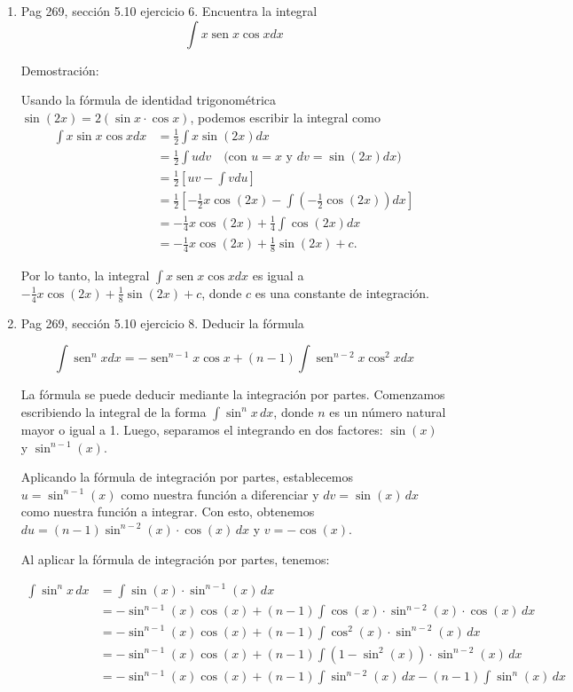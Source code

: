 \documentclass{report}
\begin{document}
\begin{enumerate}
        \item Pag 269, sección 5.10 ejercicio 6. Encuentra la integral $$\int x \operatorname{sen} x \cos x dx$$
        
        Demostración:
        
        Usando la fórmula de identidad trigonométrica $\sin(2x) = 2(\sin x \cdot \cos x)$, podemos escribir la integral como
        \begin{align*}
        \int x \sin x \cos x dx &= \frac{1}{2} \int x \sin(2x) dx \\
        &= \frac{1}{2} \int u dv \quad \text{(con $u = x$ y $dv = \sin(2x) dx$)} \\
        &= \frac{1}{2} \left[ uv - \int v du \right] \\
        &= \frac{1}{2} \left[ -\frac{1}{2} x \cos(2x) - \int \left(-\frac{1}{2} \cos(2x) \right) dx \right] \\
        &= -\frac{1}{4} x \cos(2x) + \frac{1}{4} \int \cos(2x) dx \\
        &= -\frac{1}{4} x \cos(2x) + \frac{1}{8} \sin(2x) + c.
        \end{align*}
        
        Por lo tanto, la integral $\int x \operatorname{sen} x \cos x dx$ es igual a $-\frac{1}{4} x \cos(2x) + \frac{1}{8} \sin(2x) + c$, donde $c$ es una constante de integración.
        
        \item Pag 269, sección 5.10 ejercicio 8. Deducir la fórmula 
        
        $$
        \int \operatorname{sen}^{n} x d x=-\operatorname{sen}^{n-1} x \cos x+(n-1) \int \operatorname{sen}^{n-2} x \cos ^{2} x d x
        $$
        
        La fórmula se puede deducir mediante la integración por partes. Comenzamos escribiendo la integral de la forma $\int \sin^n x \, dx$, donde $n$ es un número natural mayor o igual a 1. Luego, separamos el integrando en dos factores: $\sin(x)$ y $\sin^{n-1}(x)$.
        
        Aplicando la fórmula de integración por partes, establecemos $u=\sin^{n-1}(x)$ como nuestra función a diferenciar y $dv=\sin(x) \, dx$ como nuestra función a integrar. Con esto, obtenemos $du=(n-1) \sin^{n-2}(x) \cdot \cos(x) \, dx$ y $v=-\cos(x)$.
        
        Al aplicar la fórmula de integración por partes, tenemos:
        
        \[
        \begin{aligned}
        \int \sin^n x \, dx & =\int \sin(x) \cdot \sin^{n-1}(x) \, dx \\
        & =-\sin^{n-1}(x) \cos(x)+(n-1) \int \cos(x) \cdot \sin^{n-2}(x) \cdot \cos(x) \, dx \\
        & =-\sin^{n-1}(x) \cos(x)+(n-1) \int \cos^2(x) \cdot \sin^{n-2}(x) \, dx \\
        & =-\sin^{n-1}(x) \cos(x)+(n-1) \int \left(1-\sin^2(x)\right) \cdot \sin^{n-2}(x) \, dx \\
        & =-\sin^{n-1}(x) \cos(x)+(n-1) \int \sin^{n-2}(x) \, dx-(n-1) \int \sin^n(x) \, dx
        \end{aligned}
        \]
        

\end{enumerate}
\end{document}
